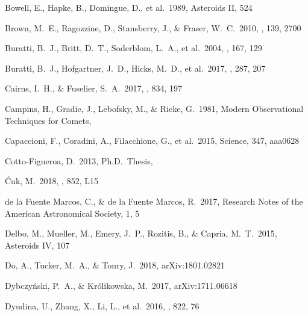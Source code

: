 \documentclass[a4paper,fleqn,usenatbib]{mnras}
\begin{document}
\begin{thebibliography}{99}

 Bowell, E., Hapke, B., Domingue, D., et al.\ 1989, Asteroids II, 524 

 Brown, M.~E., Ragozzine, D., Stansberry, J., \& Fraser, W.~C.\ 2010, \aj, 139, 2700 

 Buratti, B.~J., Britt, D.~T., Soderblom, L.~A., et al.\ 2004, \icarus, 167, 129 

 Buratti, B.~J., Hofgartner, J.~D., Hicks, M.~D., et al.\ 2017, \icarus, 287, 207 

 Cairns, I.~H., \& Fuselier, S.~A.\ 2017, \apj, 834, 197

 Campins, H., Gradie, J., Lebofsky, M., \& Rieke, G.\ 1981, Modern Observational Techniques for Comets,

 Capaccioni, F., Coradini, A., Filacchione, G., et al.\ 2015, Science, 347, aaa0628 

 Cotto-Figueroa, D.\ 2013, Ph.D.~Thesis,  

 {\'C}uk, M.\ 2018, \apjl, 852, L15

 de la Fuente Marcos, C., \& de la Fuente Marcos, R.\ 2017, Research Notes of the American Astronomical Society, 1, 5

 Delbo, M., Mueller, M., Emery, J.~P., Rozitis, B., \& Capria, M.~T.\ 2015, Asteroids IV, 107 

 Do, A., Tucker, M.~A., \& Tonry, J.\ 2018, arXiv:1801.02821

 Dybczy{\'n}ski, P.~A., \& Kr{\'o}likowska, M.\ 2017, arXiv:1711.06618

 Dyudina, U., Zhang, X., Li, L., et al.\ 2016, \apj, 822, 76 


\end{thebibliography}
\end{document}
